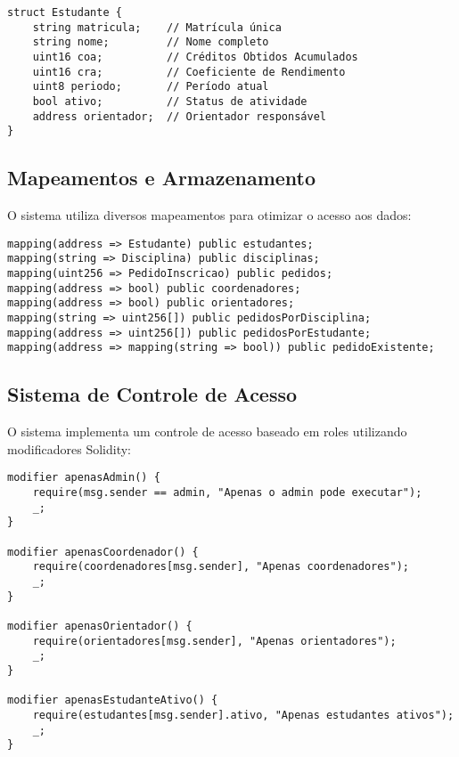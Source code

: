 \documentclass[12pt,a4paper]{article}
\begin{document}
\begin{lstlisting}[caption=Estrutura Estudante]
struct Estudante {
    string matricula;    // Matrícula única
    string nome;         // Nome completo
    uint16 coa;          // Créditos Obtidos Acumulados
    uint16 cra;          // Coeficiente de Rendimento
    uint8 periodo;       // Período atual
    bool ativo;          // Status de atividade
    address orientador;  // Orientador responsável
}
\end{lstlisting}

\subsection{Mapeamentos e Armazenamento}

O sistema utiliza diversos mapeamentos para otimizar o acesso aos dados:

\begin{lstlisting}[caption=Mapeamentos do Sistema]
mapping(address => Estudante) public estudantes;
mapping(string => Disciplina) public disciplinas;
mapping(uint256 => PedidoInscricao) public pedidos;
mapping(address => bool) public coordenadores;
mapping(address => bool) public orientadores;
mapping(string => uint256[]) public pedidosPorDisciplina;
mapping(address => uint256[]) public pedidosPorEstudante;
mapping(address => mapping(string => bool)) public pedidoExistente;
\end{lstlisting}

\subsection{Sistema de Controle de Acesso}

O sistema implementa um controle de acesso baseado em roles utilizando modificadores Solidity:

\begin{lstlisting}[caption=Modificadores de Controle de Acesso]
modifier apenasAdmin() {
    require(msg.sender == admin, "Apenas o admin pode executar");
    _;
}

modifier apenasCoordenador() {
    require(coordenadores[msg.sender], "Apenas coordenadores");
    _;
}

modifier apenasOrientador() {
    require(orientadores[msg.sender], "Apenas orientadores");
    _;
}

modifier apenasEstudanteAtivo() {
    require(estudantes[msg.sender].ativo, "Apenas estudantes ativos");
    _;
}
\end{lstlisting}
\end{document}
